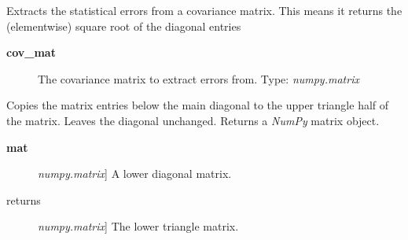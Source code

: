 \documentclass[a4paper,10pt,english]{sphinxmanual}
\begin{document}

\begin{fulllineitems}
\label{index:kafe.numeric_tools.extract_statistical_errors}
Extracts the statistical errors from a covariance matrix. This means
it returns the (elementwise) square root of the diagonal entries
\begin{description}
\item[{\textbf{cov\_mat}}] \leavevmode
The covariance matrix to extract errors from. Type: \emph{numpy.matrix}

\end{description}

\end{fulllineitems}


\begin{fulllineitems}
\label{index:kafe.numeric_tools.make_symmetric_lower}
Copies the matrix entries below the main diagonal to the upper triangle
half of the matrix. Leaves the diagonal unchanged. Returns a \emph{NumPy} matrix
object.
\begin{description}
\item[{\textbf{mat}}] \leavevmode{[}\emph{numpy.matrix}{]}
A lower diagonal matrix.

\item[{returns}] \leavevmode{[}\emph{numpy.matrix}{]}
The lower triangle matrix.

\end{description}

\end{fulllineitems}

\end{document}
